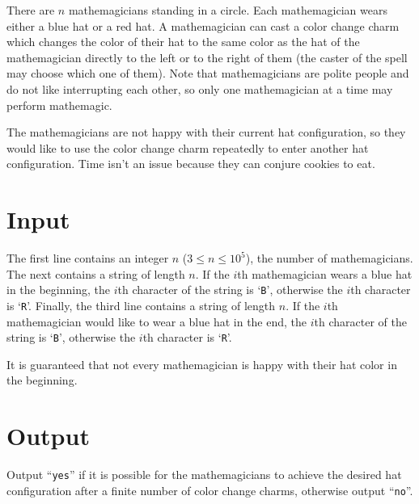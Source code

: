
\noindent
There are $n$ mathemagicians standing in a circle. Each mathemagician wears either a blue hat or a red hat. A mathemagician can cast a color change charm which changes the color of their hat to the same color as the hat of the mathemagician directly to the left or to the right of them (the caster of the spell may choose which one of them). Note that mathemagicians are polite people and do not like interrupting each other, so only one mathemagician at a time may perform mathemagic.

The mathemagicians are not happy with their current hat configuration, so they would like to use the color change charm repeatedly to enter another hat configuration. Time isn't an issue because they can conjure cookies to eat.

\section*{Input}

The first line contains an integer $n$ ($3 \leq n \leq 10^5$), the number of mathemagicians.
The next contains a string of length $n$. If the $i$th mathemagician wears a blue hat in the beginning, the $i$th character of the string is `\texttt{B}', otherwise the $i$th character is `\texttt{R}'.
Finally, the third line contains a string of length $n$. If the $i$th mathemagician would like to wear a blue hat in the end, the $i$th character of the string is `\texttt{B}', otherwise the $i$th character is `\texttt{R}'.

It is guaranteed that not every mathemagician is happy with their hat color in the beginning.

\section*{Output}
Output ``\texttt{yes}'' if it is possible for the mathemagicians to achieve the desired hat configuration after a finite number of color change charms, otherwise output ``\texttt{no}''.
